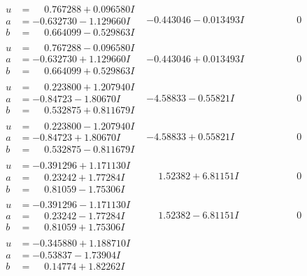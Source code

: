 \documentclass[1p]{elsarticle_modified}
\theoremstyle{definition}
\begin{document}
$$\begin{array}{c|c|c}
\begin{aligned}
u &= \phantom{-}0.767288 + 0.096580 I \\
a &= -0.632730 - 1.129660 I \\
b &= \phantom{-}0.664099 - 0.529863 I\end{aligned}
 & -0.443046 - 0.013493 I & \phantom{-0.000000 } 0 \\ \hline\begin{aligned}
u &= \phantom{-}0.767288 - 0.096580 I \\
a &= -0.632730 + 1.129660 I \\
b &= \phantom{-}0.664099 + 0.529863 I\end{aligned}
 & -0.443046 + 0.013493 I & \phantom{-0.000000 } 0 \\ \hline\begin{aligned}
u &= \phantom{-}0.223800 + 1.207940 I \\
a &= -0.84723 - 1.80670 I \\
b &= \phantom{-}0.532875 + 0.811679 I\end{aligned}
 & -4.58833 - 0.55821 I & \phantom{-0.000000 } 0 \\ \hline\begin{aligned}
u &= \phantom{-}0.223800 - 1.207940 I \\
a &= -0.84723 + 1.80670 I \\
b &= \phantom{-}0.532875 - 0.811679 I\end{aligned}
 & -4.58833 + 0.55821 I & \phantom{-0.000000 } 0 \\ \hline\begin{aligned}
u &= -0.391296 + 1.171130 I \\
a &= \phantom{-}0.23242 + 1.77284 I \\
b &= \phantom{-}0.81059 - 1.75306 I\end{aligned}
 & \phantom{-}1.52382 + 6.81151 I & \phantom{-0.000000 } 0 \\ \hline\begin{aligned}
u &= -0.391296 - 1.171130 I \\
a &= \phantom{-}0.23242 - 1.77284 I \\
b &= \phantom{-}0.81059 + 1.75306 I\end{aligned}
 & \phantom{-}1.52382 - 6.81151 I & \phantom{-0.000000 } 0 \\ \hline\begin{aligned}
u &= -0.345880 + 1.188710 I \\
a &= -0.53837 - 1.73904 I \\
b &= \phantom{-}0.14774 + 1.82262 I\end{aligned}

\end{array}$$
\end{document}
